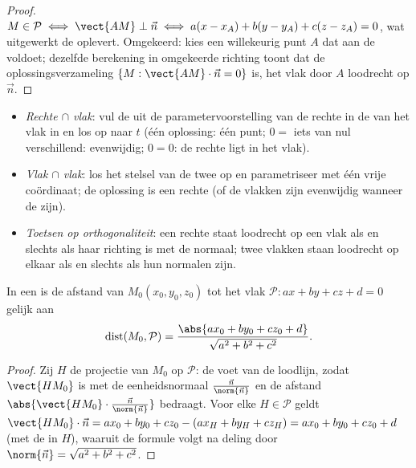 \begin{proof}
$M \in \mathcal P \iff \vect{AM} \perp \vec n \iff
a(x - x_A) + b(y - y_A) + c(z - z_A) = 0$, wat uitgewerkt de 
oplevert. Omgekeerd: kies een willekeurig punt $A$ dat aan de 
voldoet; dezelfde berekening in omgekeerde richting toont dat de
oplossingsverzameling $\{M : \vect{AM}\cdot\vec n = 0\}$ is, het vlak door $A$
loodrecht op $\vec n$.
\end{proof}

\begin{method}\label{met:g12:space:intersections}
\begin{itemize}
  \item \emph{Rechte $\cap$ vlak}: vul de  uit de
        parametervoorstelling van de rechte in de  van het vlak in
        en los op naar $t$ (één oplossing: één punt; $0 = $ iets van nul
        verschillend: evenwijdig; $0 = 0$: de rechte ligt in het vlak).
  \item \emph{Vlak $\cap$ vlak}: los het stelsel van de twee  op
        en parametriseer met één vrije coördinaat; de oplossing is een rechte
        (of de vlakken zijn evenwijdig wanneer de  
        zijn).
  \item \emph{Toetsen op orthogonaliteit}: een rechte staat loodrecht op een
        vlak als en slechts als haar richting  is met de normaal;
        twee vlakken staan loodrecht op elkaar als en slechts als hun normalen
         zijn.
\end{itemize}
\end{method}

\begin{proposition}\label{prop:g12:space:distance}
In een  is de afstand van $M_0(x_0, y_0, z_0)$ tot
het vlak $\mathcal P : ax + by + cz + d = 0$ gelijk aan
\[
\operatorname{dist}(M_0, \mathcal P)
= \frac{\abs{ax_0 + by_0 + cz_0 + d}}{\sqrt{a^2 + b^2 + c^2}}.
\]
\end{proposition}

\begin{proof}
Zij $H$ de  projectie van $M_0$ op $\mathcal P$: de voet van de
loodlijn, zodat $\vect{HM_0}$  is met de eenheidsnormaal
$\frac{\vec n}{\norm{\vec n}}$ en de afstand
$\abs{\vect{HM_0}\cdot \frac{\vec n}{\norm{\vec n}}}$ bedraagt. Voor elke
$H \in \mathcal P$ geldt
$\vect{HM_0}\cdot\vec n = ax_0 + by_0 + cz_0 - (ax_H + by_H + cz_H)
= ax_0 + by_0 + cz_0 + d$ (met de  in $H$), waaruit de formule
volgt na deling door $\norm{\vec n} = \sqrt{a^2+b^2+c^2}$.
\end{proof}

